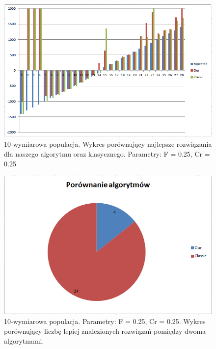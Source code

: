 \documentclass[a4paper]{article}
\begin{document}
\begin{figure}[!h]
\centering
\includegraphics[width=\textwidth]{F25Cr25L10chart.png}
\caption{10-wymiarowa populacja. Wykres porównujący najlepsze rozwiązania dla naszego algorytmu oraz klasycznego. Parametry: F = 0.25, Cr = 0.25}
\end{figure}

\begin{figure}[!h]
\centering
\includegraphics[width=\textwidth]{F25Cr25L10statystyka.png}
\caption{10-wymiarowa populacja. Parametry: F = 0.25, Cr = 0.25. Wykres porównujący liczbę lepiej znalezionych rozwiązań pomiędzy dwoma algorytmami.}
\end{figure}
\end{document}
